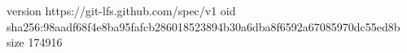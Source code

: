 version https://git-lfs.github.com/spec/v1
oid sha256:98aadf68f4e8ba95fafcb286018523894b30a6dba8f6592a67085970dc55ed8b
size 174916
